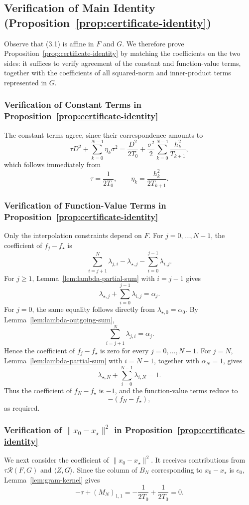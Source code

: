 \documentclass[11pt, hidelinks]{article}
\begin{document}
\subsection{Verification of Main Identity (Proposition~\ref{prop:certificate-identity})}
Observe that (3.1) is affine in $F$ and $G$. We therefore prove Proposition~\ref{prop:certificate-identity} by matching the coefficients on the two sides: it suffices to verify agreement of the constant and function-value terms, together with the coefficients of all squared-norm and inner-product terms represented in $G$.
\subsubsection{Verification of Constant Terms in Proposition~\ref{prop:certificate-identity}}
The constant terms agree, since their correspondence amounts to
\[\tau D^2+\sum_{k=0}^{N-1}\eta_k\sigma^2= \frac{D^2}{2T_0}
+\frac{\sigma^2}{2}\sum_{k=0}^{N-1}\frac{h_k^2}{T_{k+1}}, \]
which follows immediately from
\[ \tau=\frac{1}{2T_0}, \qquad \eta_k=\frac{h_k^2}{2T_{k+1}}. \]
\subsubsection{Verification of Function-Value Terms in Proposition~\ref{prop:certificate-identity}}
Only the interpolation constraints depend on $F$. For $j=0,\ldots,N-1$, the coefficient of $f_j-f_\star$ is
\[\sum_{i=j+1}^{N}\lambda_{j,i}-\lambda_{\star,j}-\sum_{i=0}^{j-1}\lambda_{i,j}.\]
For $j\ge1$, Lemma~\ref{lem:lambda-partial-sum} with $i=j-1$ gives
\[\lambda_{\star,j}+\sum_{i=0}^{j-1}\lambda_{i,j}=\alpha_j.\]
For $j=0$, the same equality follows directly from $\lambda_{\star,0}=\alpha_0$. By Lemma~\ref{lem:lambda-outgoing-sum},
\[ \sum_{i=j+1}^{N}\lambda_{j,i}=\alpha_j.\]
Hence the coefficient of $f_j-f_\star$ is zero for every $j=0,\ldots,N-1$.
For $j=N$, Lemma~\ref{lem:lambda-partial-sum} with $i=N-1$, together with $\alpha_N=1$, gives
\[\lambda_{\star,N}+\sum_{i=0}^{N-1}\lambda_{i,N}=1.\]
Thus the coefficient of $f_N-f_\star$ is $-1$, and the function-value terms reduce to
\[-(f_N-f_\star),\] as required.
\subsubsection{Verification of $\|x_0-x_\star\|^2$ in Proposition~\ref{prop:certificate-identity}}
We next consider the coefficient of $\|x_0-x_\star\|^2$. It receives contributions from $\tau\mathcal R(F,G)$ and $\langle Z,G\rangle$. Since the column of $B_N$ corresponding to $x_0-x_\star$ is $e_0$, Lemma~\ref{lem:gram-kernel} gives
\[-\tau+(M_N)_{1,1}=-\frac{1}{2T_0}+\frac{1}{2T_0}=0.\]
\end{document}
